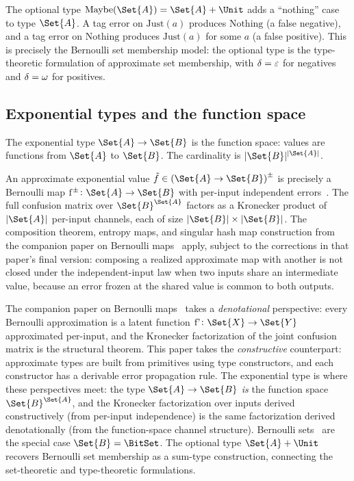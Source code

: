 \documentclass[ ../main.tex]{subfiles}
\begin{document}
\begin{example}
The optional type $\mathrm{Maybe}(\Set{A}) = \Set{A} + \Unit$ adds a ``nothing'' case to type $\Set{A}$.
A tag error on $\mathrm{Just}(a)$ produces $\mathrm{Nothing}$ (a false negative), and a tag error on $\mathrm{Nothing}$ produces $\mathrm{Just}(a)$ for some $a$ (a false positive).
This is precisely the Bernoulli set membership model: the optional type is the type-theoretic formulation of approximate set membership, with $\delta = \varepsilon$ for negatives and $\delta = \omega$ for positives.
\end{example}

\subsection{Exponential types and the function space}
\label{sec:exponential}

The exponential type $\Set{A} \to \Set{B}$ is the function space: values are functions from $\Set{A}$ to $\Set{B}$.
The cardinality is $|\Set{B}|^{|\Set{A}|}$.

\begin{remark}
An approximate exponential value $\tilde{f} \in \AT{(\Set{A} \to \Set{B})}$ is precisely a Bernoulli map $\APFun{f} \colon \Set{A} \to \Set{B}$ with per-input independent errors~\cite{bernoulliMaps}.
The full confusion matrix over $\Set{B}^{\Set{A}}$ factors as a Kronecker product of $|\Set{A}|$ per-input channels, each of size $|\Set{B}| \times |\Set{B}|$.
The composition theorem, entropy maps, and singular hash map construction from the companion paper on Bernoulli maps~\cite{bernoulliMaps} apply, subject to the corrections in that paper's final version: composing a realized approximate map with another is not closed under the independent-input law when two inputs share an intermediate value, because an error frozen at the shared value is common to both outputs.
\end{remark}

\begin{remark}
\label{rem:convergence}
The companion paper on Bernoulli maps~\cite{bernoulliMaps} takes a \emph{denotational} perspective: every Bernoulli approximation is a latent function $\Fun{f'} \colon \Set{X} \to \Set{Y}$ approximated per-input, and the Kronecker factorization of the joint confusion matrix is the structural theorem.
This paper takes the \emph{constructive} counterpart: approximate types are built from primitives using type constructors, and each constructor has a derivable error propagation rule.
The exponential type is where these perspectives meet: the type $\Set{A} \to \Set{B}$ \emph{is} the function space $\Set{B}^{\Set{A}}$, and the Kronecker factorization over inputs derived constructively (from per-input independence) is the same factorization derived denotationally (from the function-space channel structure).
Bernoulli sets~\cite{bernoulliSets} are the special case $\Set{B} = \BitSet$.
The optional type $\Set{A} + \Unit$ recovers Bernoulli set membership as a sum-type construction, connecting the set-theoretic and type-theoretic formulations.
\end{remark}
\end{document}
